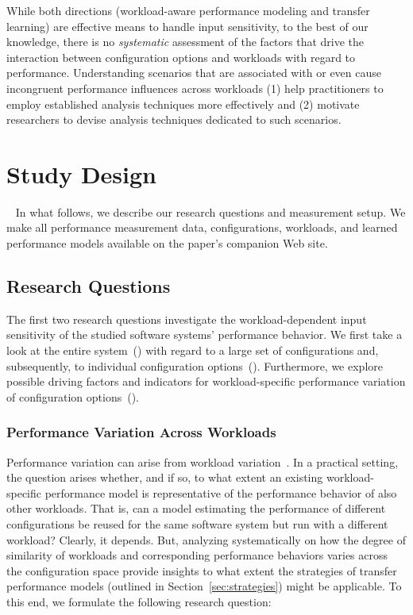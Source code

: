 {While both directions (workload-aware performance modeling and transfer learning) are effective means to handle input sensitivity, to the best of our knowledge, there is no \textit{systematic} assessment of the factors that drive the interaction between configuration options and workloads with regard to performance. Understanding scenarios that are associated with or even cause incongruent performance influences across workloads (1) help practitioners to employ established analysis techniques more effectively and (2) motivate researchers to devise analysis techniques dedicated to such scenarios.

\section{Study Design}~\label{sec:study}
In what follows, we describe our research questions and measurement setup. We make all performance measurement data, configurations, workloads, and learned performance models available on the paper's companion Web site.

\subsection{Research Questions}
The first two research questions investigate the workload-dependent input sensitivity of the studied software systems' performance behavior. We first take a look at the entire system~() with regard to a large set of configurations and, subsequently, to individual configuration options~(). Furthermore, we explore possible driving factors and indicators for workload-specific performance variation of configuration options~().

\subsubsection{Performance Variation Across Workloads}
Performance variation can arise from workload variation~\cite{benchmarking_book}. In a practical setting, the question arises whether, and if so, to what extent an existing workload-specific performance model is representative of the performance behavior of also other workloads. 
That is, can a model estimating the performance of different configurations be reused for the same software system but run with a different workload? 
Clearly, it depends. But, analyzing systematically on how the degree of similarity of workloads and corresponding performance behaviors varies across the configuration space provide insights to what extent the strategies of transfer performance models (outlined in Section~\ref{sec:strategies}) might be applicable.
To this end, we formulate the following research question: 

}

